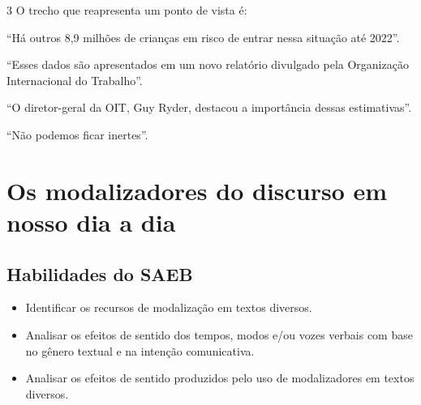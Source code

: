 \num{3} O trecho que reapresenta um ponto de vista é:

\begin{escolha}
\item ``Há outros 8,9 milhões de crianças em risco de entrar nessa situação
até 2022''.
\item ``Esses dados são apresentados em um novo relatório divulgado pela
Organização Internacional do Trabalho''.
\item ``O diretor-geral da OIT, Guy Ryder, destacou a importância dessas
estimativas''.
\item ``Não podemos ficar inertes''.
\end{escolha}




\chapter{Os modalizadores do discurso em nosso dia a dia}

\section*{Habilidades do SAEB}
\begin{itemize}
\item Identificar os recursos de modalização em textos
diversos. 
\item Analisar os efeitos de sentido dos tempos, modos e/ou vozes
verbais com base no gênero textual e na intenção comunicativa.
\item Analisar os efeitos de sentido produzidos pelo uso de modalizadores em
textos diversos.
\end{itemize}


